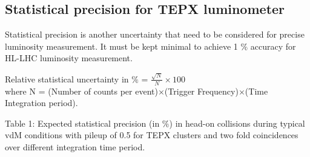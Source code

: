 \subsection{Statistical precision for TEPX luminometer}
Statistical precision is another uncertainty that need to be considered for precise luminosity measurement. It must be kept minimal to achieve 1 $\%$ accuracy for HL-LHC luminosity measurement.

Relative statistical uncertainty in $\%$ = $\frac{\sqrt{N}}{N} \times 100$ \\

where N = (Number of counts per event)$\times$(Trigger Frequency)$\times$(Time Integration period). 

\newpage
\begin{flushleft} 
Table 1: Expected statistical precision (in $\%$) in head-on collisions during typical vdM conditions with pileup of 0.5 for TEPX clusters and two fold coincidences over different integration time period.
\end{flushleft} 
\begin{center}
\end{center}

